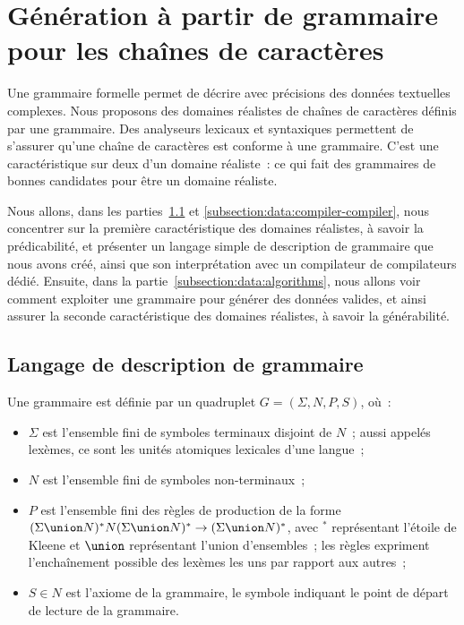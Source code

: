 \section{Génération à partir de grammaire pour les chaînes de caractères}
\label{section:data:strings}

Une grammaire formelle permet de décrire avec précisions des données textuelles
complexes. Nous proposons des domaines réalistes de chaînes de caractères
définis par une grammaire. Des analyseurs lexicaux et syntaxiques permettent de
s'assurer qu'une chaîne de caractères est conforme à une grammaire. C'est une
caractéristique sur deux d'un domaine réaliste~: ce qui fait des grammaires de
bonnes candidates pour être un domaine réaliste.

Nous allons, dans les parties~\ref{subsection:data:pp} et
\ref{subsection:data:compiler-compiler}, nous concentrer sur la première
caractéristique des domaines réalistes, à savoir la prédicabilité, et présenter
un langage simple de description de grammaire que nous avons créé, ainsi que son
interprétation avec un compilateur de compilateurs dédié. Ensuite, dans la
partie~\ref{subsection:data:algorithms}, nous allons voir comment exploiter une
grammaire pour générer des données valides, et ainsi assurer la seconde
caractéristique des domaines réalistes, à savoir la générabilité.

\subsection{Langage de description de grammaire}
\label{subsection:data:pp}

\begin{definition}[Grammaire]

Une grammaire est définie par un quadruplet $G = (\Sigma, N, P, S)$, où~:
%
\begin{itemize}

\item $\Sigma$ est l'ensemble fini de {\strong symboles terminaux} disjoint de
$N$~; aussi appelés {\strong lexèmes}, ce sont les unités atomiques lexicales
d'une langue~;

\item $N$ est l'ensemble fini de {\strong symboles non-terminaux}~;

\item $P$ est l'ensemble fini des {\strong règles de production} de la forme
$(\Sigma \union N)^* N (\Sigma \union N)^* \rightarrow (\Sigma \union N)^*$,
avec $^*$ représentant l'étoile de Kleene et $\union$ représentant l'union
d'ensembles~; les règles expriment l'enchaînement possible des lexèmes les uns
par rapport aux autres~;

\item $S \in N$ est l'axiome de la grammaire, le symbole indiquant le point de
départ de lecture de la grammaire.

\end{itemize}

\end{definition}

